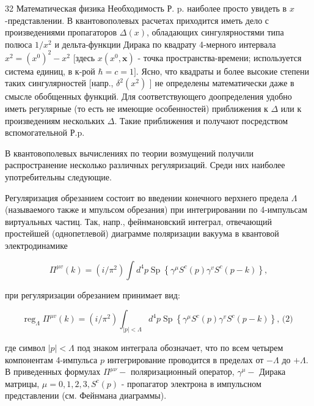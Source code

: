 \documentclass[10pt]{article}
\begin{document}
32 Математическая физика Необходимость Р. p. наиболее просто увидеть в $x$-представлении. В квантовополевых расчетах приходится иметь дело с произведениями пропагаторов $\Delta(x)$, обладающих сингулярностями типа полюса $1 / x^{2}$ и дельта-функции Дирака по квадрату 4-мерного интервала $x^{2}=\left(x^{0}\right)^{2}-x^{2}$ [здесь $x\left(x^{0}, \boldsymbol{x}\right)$ - точка пространства-времени; используется система единиц, в к-рой $\hbar=c=1]$. Ясно, что квадраты и более высокие степени таких сингулярностей [напр., $\delta^{2}\left(x^{2}\right)$ ] не определены математически даже в смысле обобщенных функций. Для соответствующего доопределения удобно иметь регулярные (то есть не имеющие особенностей) приближения к $\Delta$ или к произведениям нескольких $\Delta$. Такие приближения и получают посредством вспомогательной Р.p.



В квантовополевых вычислениях по теории возмущений получили распространение несколько различных регуляризаций. Среди них наиболее употребительны следующие.



Регуляризация обрезанием состоит во введении конечного верхнего предела $\Lambda$ (называемого также и мпульсом обрезания) при интегрировании по 4-импульсам виртуальных частиц. Так, напр., фейнмановский интеграл, отвечающий простейшей (однопетлевой) диаграмме поляризации вакуума в квантовой электродинамике



\[

\Pi^{\mu v}(k)=\left(i / \pi^{2}\right) \int d^{4} p \operatorname{Sp}\left\{\gamma^{\mu} S^{c}(p) \gamma^{v} S^{c}(p-k)\right\},

\]



при регуляризации обрезанием принимает вид:



\[

\operatorname{reg}_{\Lambda} \Pi^{\mu v}(k)=\left(i / \pi^{2}\right) \int_{|p|<\Lambda} d^{4} p \operatorname{Sp}\left\{\gamma^{\mu} S^{c}(p) \gamma^{v} S^{c}(p-k)\right\} \text {, (2) }

\]



где символ $|p|<\Lambda$ под знаком интеграла обозначает, что по всем четырем компонентам 4-импульса $p$ интегрирование проводится в пределах от $-\Lambda$ до $+\Lambda$. В приведенных формулах $\Pi^{\mu \nu}-$ поляризационный оператор, $\gamma^{\mu}-$ Дирака матрицы, $\mu=0,1,2,3, S^{c}(p)$ - пропагатор электрона в импульсном представлении (см. Фейнмана диаграммы).
\end{document}
